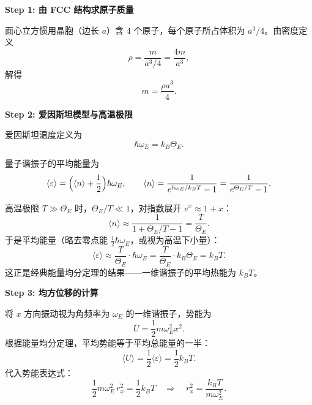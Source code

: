 \begin{derivationbox}[标准解题过程]
\textbf{Step 1: 由 FCC 结构求原子质量}

面心立方惯用晶胞（边长 $a$）含 4 个原子，每个原子所占体积为 $a^3/4$。由密度定义
\begin{equation}
\rho = \frac{m}{a^3/4} = \frac{4m}{a^3},
\end{equation}
解得
\begin{equation}
\boxed{m = \frac{\rho a^3}{4}.}
\label{eq:fcc-mass}
\end{equation}

\textbf{Step 2: 爱因斯坦模型与高温极限}

爱因斯坦温度定义为
\begin{equation}
\hbar\omega_E = k_B\Theta_E.
\label{eq:einstein-temp}
\end{equation}

量子谐振子的平均能量为
\begin{equation}
\langle\varepsilon\rangle = \Bigl(\langle n\rangle + \frac12\Bigr)\hbar\omega_E, \qquad \langle n\rangle = \frac{1}{e^{\hbar\omega_E/k_BT}-1} = \frac{1}{e^{\Theta_E/T}-1}.
\end{equation}

高温极限 $T\gg\Theta_E$ 时，$\Theta_E/T\ll1$，对指数展开 $e^x\approx1+x$：
\begin{equation}
\langle n\rangle \approx \frac{1}{1+\Theta_E/T-1} = \frac{T}{\Theta_E}.
\end{equation}
于是平均能量（略去零点能 $\frac12\hbar\omega_E$，或视为高温下小量）：
\begin{equation}
\langle\varepsilon\rangle \approx \frac{T}{\Theta_E}\cdot\hbar\omega_E = \frac{T}{\Theta_E}\cdot k_B\Theta_E = k_BT.
\end{equation}
这正是经典能量均分定理的结果——一维谐振子的平均热能为 $k_BT$。

\textbf{Step 3: 均方位移的计算}

将 $x$ 方向振动视为角频率为 $\omega_E$ 的一维谐振子，势能为
\begin{equation}
U = \frac12 m\omega_E^2 x^2.
\end{equation}
根据能量均分定理，平均势能等于平均总能量的一半：
\begin{equation}
\langle U\rangle = \frac12\langle\varepsilon\rangle = \frac12 k_BT.
\end{equation}
代入势能表达式：
\begin{equation}
\frac12 m\omega_E^2\,\overline{r_x^2} = \frac12 k_BT \quad\Longrightarrow\quad \overline{r_x^2} = \frac{k_BT}{m\omega_E^2}.
\label{eq:msd-raw}
\end{equation}


\end{derivationbox}
